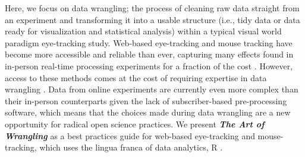 Here, we focus on data wrangling; the process of cleaning raw data straight from an experiment and transforming it into a usable structure (i.e., tidy data or data ready for visualization and statistical analysis) within a typical visual world paradigm eye-tracking study. Web-based eye-tracking and mouse tracking have become more accessible and reliable than ever, capturing many effects found in in-person real-time processing experiments for a fraction of the cost \parencite[e.g.,][]{Vos_2017,Semmelmann_2017,Prystauka_Altmann_Rothman_2023,Degen_Seeing_2021}. However, access to these methods comes at the cost of requiring expertise in data wrangling \parencite[e.g., ][]{Vos_2017,Prystauka_Altmann_Rothman_2023}. Data from online experiments are currently even more complex than their in-person counterparts given the lack of subscriber-based pre-processing software, which means that the choices made during data wrangling are a new opportunity for radical open science practices. We present \textit{\textbf{The Art of Wrangling}} as a best practices guide for web-based eye-tracking and mouse-tracking, which uses the lingua franca of data analytics, R \parencite{mizumoto_r_2015, R}. 
